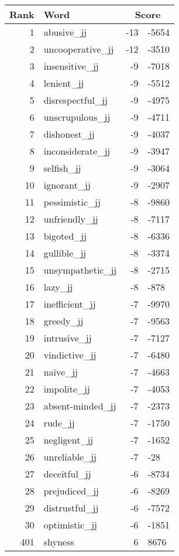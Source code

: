 \begin{longtable}[!htbp]{| rlr@{.}l |}
    \hline
    \textbf{Rank} & \textbf{Word} & \multicolumn{2}{c|}{\textbf{Score}} \\
    \hline
    \endhead
    1 & abusive\_jj & -13 & -5654 \\
    2 & uncooperative\_jj & -12 & -3510 \\
    3 & insensitive\_jj & -9 & -7018 \\
    4 & lenient\_jj & -9 & -5512 \\
    5 & disrespectful\_jj & -9 & -4975 \\
    6 & unscrupulous\_jj & -9 & -4711 \\
    7 & dishonest\_jj & -9 & -4037 \\
    8 & inconsiderate\_jj & -9 & -3947 \\
    9 & selfish\_jj & -9 & -3064 \\
    10 & ignorant\_jj & -9 & -2907 \\
    11 & pessimistic\_jj & -8 & -9860 \\
    12 & unfriendly\_jj & -8 & -7117 \\
    13 & bigoted\_jj & -8 & -6336 \\
    14 & gullible\_jj & -8 & -3374 \\
    15 & unsympathetic\_jj & -8 & -2715 \\
    16 & lazy\_jj & -8 & -878 \\
    17 & inefficient\_jj & -7 & -9970 \\
    18 & greedy\_jj & -7 & -9563 \\
    19 & intrusive\_jj & -7 & -7127 \\
    20 & vindictive\_jj & -7 & -6480 \\
    21 & naïve\_jj & -7 & -4663 \\
    22 & impolite\_jj & -7 & -4053 \\
    23 & absent-minded\_jj & -7 & -2373 \\
    24 & rude\_jj & -7 & -1750 \\
    25 & negligent\_jj & -7 & -1652 \\
    26 & unreliable\_jj & -7 & -28 \\
    27 & deceitful\_jj & -6 & -8734 \\
    28 & prejudiced\_jj & -6 & -8269 \\
    29 & distrustful\_jj & -6 & -7572 \\
    30 & optimistic\_jj & -6 & -1851 \\
    401 & shyness & 6 & 8676 \\

\end{longtable}
